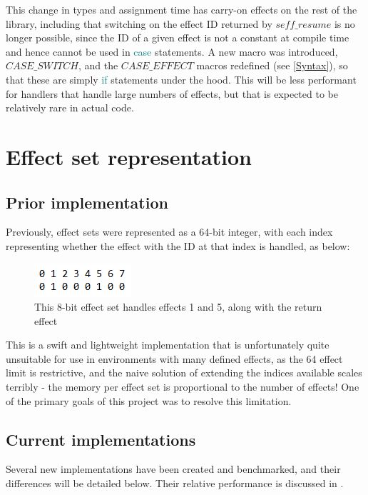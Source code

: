 \documentclass[logo,bsc,singlespacing,parskip,online]{infthesis}
\begin{document}
This change in types and assignment time has carry-on effects on the rest of the library, including that switching on the effect ID returned by $seff\_resume$ is no longer possible, since the ID of a given effect is not a constant at compile time and hence cannot be used in \textcolor{teal}{case} statements. A new macro was introduced, $CASE\_SWITCH$, and the $CASE\_EFFECT$ macros redefined (see \cref{Syntax}), so that these are simply \textcolor{teal}{if} statements under the hood. This will be less performant for handlers that handle large numbers of effects, but that is expected to be relatively rare in actual code.

\section{Effect set representation}

\subsection{Prior implementation}

Previously, effect sets were represented as a 64-bit integer, with each index representing whether the effect with the ID at that index is handled, as below:

\begin{figure}[ht]
    \centering
    \includegraphics[width=0.3\linewidth]{effect_set.png}
    \caption{This 8-bit effect set handles effects 1 and 5, along with the return effect}
\end{figure}

This is a swift and lightweight implementation that is unfortunately quite unsuitable for use in environments with many defined effects, as the 64 effect limit is restrictive, and the naive solution of extending the indices available scales terribly - the memory per effect set is proportional to the number of effects! One of the primary goals of this project was to resolve this limitation.

\subsection{Current implementations} \label{impls_here}

Several new implementations have been created and benchmarked, and their differences will be detailed below. Their relative performance is discussed in .
\end{document}
